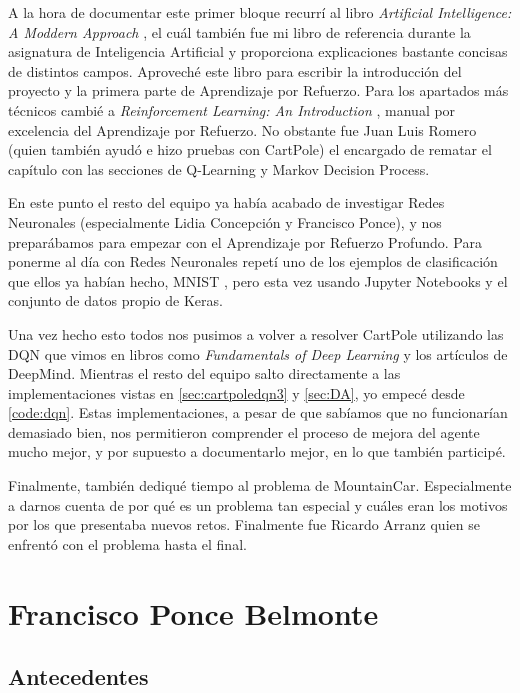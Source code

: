 A la hora de documentar este primer bloque recurrí al libro \textit{Artificial Intelligence: A Moddern Approach} \citep{Russell:2009:AIM:1671238}, el cuál también fue mi libro de referencia durante la asignatura de Inteligencia Artificial y proporciona explicaciones bastante concisas de distintos campos. Aproveché este libro para escribir la introducción del proyecto y la primera parte de Aprendizaje por Refuerzo. Para los apartados más técnicos cambié a \textit{Reinforcement Learning: An Introduction} \citep{Sutton:2018:RLI:3312046}, manual por excelencia del Aprendizaje por Refuerzo. No obstante fue Juan Luis Romero (quien también ayudó e hizo pruebas con CartPole) el encargado de rematar el capítulo con las secciones de Q-Learning y Markov Decision Process.

En este punto el resto del equipo ya había acabado de investigar Redes Neuronales (especialmente Lidia Concepción y Francisco Ponce), y nos preparábamos para empezar con el Aprendizaje por Refuerzo Profundo. Para ponerme al día con Redes Neuronales repetí uno de los ejemplos de clasificación que ellos ya habían hecho, MNIST \citep{MNISTKeras}, pero esta vez usando Jupyter Notebooks y el conjunto de datos propio de Keras.

Una vez hecho esto todos nos pusimos a volver a resolver CartPole utilizando las DQN que vimos en libros como \textit{Fundamentals of Deep Learning} \citep{Buduma:general} y los artículos de DeepMind. Mientras el resto del equipo salto directamente a las implementaciones vistas en \ref{sec:cartpoledqn3} y \ref{sec:DA}, yo empecé desde \ref{code:dqn}. Estas implementaciones, a pesar de que sabíamos que no funcionarían demasiado bien, nos permitieron comprender el proceso de mejora del agente mucho mejor, y por supuesto a documentarlo mejor, en lo que también participé.

Finalmente, también dediqué tiempo al problema de MountainCar. Especialmente a darnos cuenta de por qué es un problema tan especial y cuáles eran los motivos por los que presentaba nuevos retos. Finalmente fue Ricardo Arranz quien se enfrentó con el problema hasta el final.

\section{Francisco Ponce Belmonte}


\subsection{Antecedentes}

